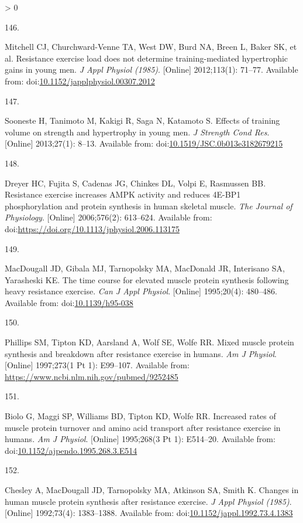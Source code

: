 \documentclass[twoside,10pt]{gihclass} %
\newlength{\cslhangindent}
\newlength{\csllabelwidth}
\newenvironment{CSLReferences}[3] %
 {%
  \setlength{\parindent}{0pt}
  \ifodd #1 \everypar{\setlength{\hangindent}{\cslhangindent}}\ignorespaces\fi
  \ifnum #2 > 0
  \setlength{\parskip}{#2\baselineskip}
  \fi
 }%
 {}
\newcommand{\CSLLeftMargin}[1]{\parbox[t]{\maxof{\widthof{#1}}{\csllabelwidth}}{#1}}
\newcommand{\CSLRightInline}[1]{\parbox[t]{\linewidth}{#1}}
\begin{document}
\begin{CSLReferences}{0}{0}
\leavevmode\hypertarget{ref-RN834}{}%
\CSLLeftMargin{146. }
\CSLRightInline{Mitchell CJ, Churchward-Venne TA, West DW, Burd NA, Breen L, Baker SK, et al. Resistance exercise load does not determine training-mediated hypertrophic gains in young men. \emph{J Appl Physiol (1985)}. {[}Online{]} 2012;113(1): 71--77. Available from: doi:\href{https://doi.org/10.1152/japplphysiol.00307.2012}{10.1152/japplphysiol.00307.2012}}

\leavevmode\hypertarget{ref-RN1607}{}%
\CSLLeftMargin{147. }
\CSLRightInline{Sooneste H, Tanimoto M, Kakigi R, Saga N, Katamoto S. Effects of training volume on strength and hypertrophy in young men. \emph{J Strength Cond Res}. {[}Online{]} 2013;27(1): 8--13. Available from: doi:\href{https://doi.org/10.1519/JSC.0b013e3182679215}{10.1519/JSC.0b013e3182679215}}

\leavevmode\hypertarget{ref-RN2710}{}%
\CSLLeftMargin{148. }
\CSLRightInline{Dreyer HC, Fujita S, Cadenas JG, Chinkes DL, Volpi E, Rasmussen BB. Resistance exercise increases AMPK activity and reduces 4E-BP1 phosphorylation and protein synthesis in human skeletal muscle. \emph{The Journal of Physiology}. {[}Online{]} 2006;576(2): 613--624. Available from: doi:\url{https://doi.org/10.1113/jphysiol.2006.113175}}

\leavevmode\hypertarget{ref-RN2711}{}%
\CSLLeftMargin{149. }
\CSLRightInline{MacDougall JD, Gibala MJ, Tarnopolsky MA, MacDonald JR, Interisano SA, Yarasheski KE. The time course for elevated muscle protein synthesis following heavy resistance exercise. \emph{Can J Appl Physiol}. {[}Online{]} 1995;20(4): 480--486. Available from: doi:\href{https://doi.org/10.1139/h95-038}{10.1139/h95-038}}

\leavevmode\hypertarget{ref-RN786}{}%
\CSLLeftMargin{150. }
\CSLRightInline{Phillips SM, Tipton KD, Aarsland A, Wolf SE, Wolfe RR. Mixed muscle protein synthesis and breakdown after resistance exercise in humans. \emph{Am J Physiol}. {[}Online{]} 1997;273(1 Pt 1): E99--107. Available from: \url{https://www.ncbi.nlm.nih.gov/pubmed/9252485}}

\leavevmode\hypertarget{ref-RN2712}{}%
\CSLLeftMargin{151. }
\CSLRightInline{Biolo G, Maggi SP, Williams BD, Tipton KD, Wolfe RR. Increased rates of muscle protein turnover and amino acid transport after resistance exercise in humans. \emph{Am J Physiol}. {[}Online{]} 1995;268(3 Pt 1): E514--20. Available from: doi:\href{https://doi.org/10.1152/ajpendo.1995.268.3.E514}{10.1152/ajpendo.1995.268.3.E514}}

\leavevmode\hypertarget{ref-RN2717}{}%
\CSLLeftMargin{152. }
\CSLRightInline{Chesley A, MacDougall JD, Tarnopolsky MA, Atkinson SA, Smith K. Changes in human muscle protein synthesis after resistance exercise. \emph{J Appl Physiol (1985)}. {[}Online{]} 1992;73(4): 1383--1388. Available from: doi:\href{https://doi.org/10.1152/jappl.1992.73.4.1383}{10.1152/jappl.1992.73.4.1383}}


\end{CSLReferences}
\end{document}
